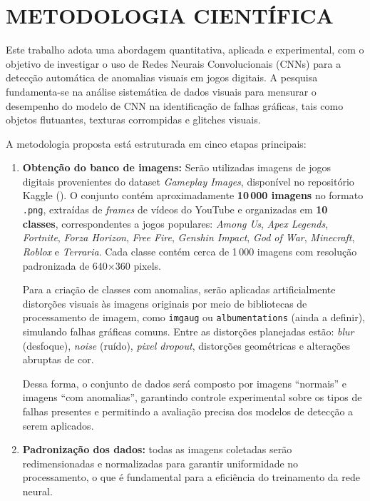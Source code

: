 \chapter{METODOLOGIA CIENTÍFICA}

Este trabalho adota uma abordagem quantitativa, aplicada e experimental, com o objetivo de investigar o uso de Redes Neurais Convolucionais (CNNs) para a detecção automática de anomalias visuais em jogos digitais. A pesquisa fundamenta-se na análise sistemática de dados visuais para mensurar o desempenho do modelo de CNN na identificação de falhas gráficas, tais como objetos flutuantes, texturas corrompidas e glitches visuais.

A metodologia proposta está estruturada em cinco etapas principais:

\begin{enumerate}
    \item \textbf{Obtenção do banco de imagens:} Serão utilizadas imagens de jogos digitais provenientes do dataset \textit{Gameplay Images}, disponível no repositório Kaggle (). O conjunto contém aproximadamente \textbf{10\,000 imagens} no formato \texttt{.png}, extraídas de \textit{frames} de vídeos do YouTube e organizadas em \textbf{10 classes}, correspondentes a jogos populares: \textit{Among Us}, \textit{Apex Legends}, \textit{Fortnite}, \textit{Forza Horizon}, \textit{Free Fire}, \textit{Genshin Impact}, \textit{God of War}, \textit{Minecraft}, \textit{Roblox} e \textit{Terraria}. Cada classe contém cerca de 1\,000 imagens com resolução padronizada de 640×360 pixels.
    
    Para a criação de classes com anomalias, serão aplicadas artificialmente distorções visuais às imagens originais por meio de bibliotecas de processamento de imagem, como \texttt{imgaug} ou \texttt{albumentations} (ainda a definir), simulando falhas gráficas comuns. Entre as distorções planejadas estão: \textit{blur} (desfoque), \textit{noise} (ruído), \textit{pixel dropout}, distorções geométricas e alterações abruptas de cor.
    
    Dessa forma, o conjunto de dados será composto por imagens “normais” e imagens “com anomalias”, garantindo controle experimental sobre os tipos de falhas presentes e permitindo a avaliação precisa dos modelos de detecção a serem aplicados.
        
    
    \item \textbf{Padronização dos dados:} todas as imagens coletadas serão redimensionadas e normalizadas para garantir uniformidade no processamento, o que é fundamental para a eficiência do treinamento da rede neural.
    

\end{enumerate}
